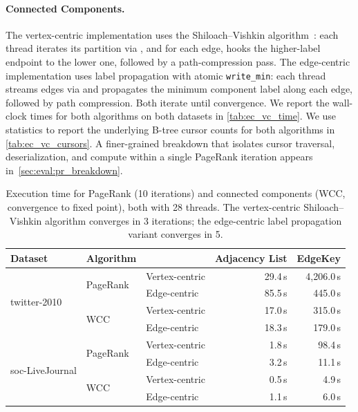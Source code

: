 \paragraph{Connected Components.}
The vertex-centric implementation uses the Shiloach--Vishkin algorithm~\cite{shiloach1982logn}: each thread iterates its partition via , and for each edge, hooks the higher-label endpoint to the lower one, followed by a path-compression pass.
The edge-centric implementation uses label propagation with atomic \texttt{write\_min}: each thread streams edges via  and propagates the minimum component label along each edge, followed by path compression.
Both iterate until convergence.
We report the wall-clock times for both algorithms on both datasets in \autoref{tab:ec_vc_time}.
We use \wt{} statistics to report the underlying \wt{} B-tree cursor counts for both algorithms in \autoref{tab:ec_vc_cursors}.
A finer-grained breakdown that isolates cursor traversal, deserialization, and compute within a single PageRank iteration appears in~\autoref{sec:eval:pr_breakdown}.

\begin{table}[ht]
\centering
\begin{tabular}{lllrr}
\toprule
\textbf{Dataset} & \textbf{Algorithm} & & \textbf{Adjacency List} & \textbf{EdgeKey} \\
\midrule
\multirow{4}{*}{twitter-2010}
  & \multirow{2}{*}{PageRank}
    & Vertex-centric &    29.4\,s & 4{,}206.0\,s \\
  & & Edge-centric   &    85.5\,s &   445.0\,s \\
  \cmidrule(l){2-5}
  & \multirow{2}{*}{\ac{WCC}}
    & Vertex-centric &    17.0\,s &   315.0\,s \\
  & & Edge-centric   &    18.3\,s &   179.0\,s \\
\midrule
\multirow{4}{*}{soc-LiveJournal}
  & \multirow{2}{*}{PageRank}
    & Vertex-centric &     1.8\,s &    98.4\,s \\
  & & Edge-centric   &     3.2\,s &    11.1\,s \\
  \cmidrule(l){2-5}
  & \multirow{2}{*}{\ac{WCC}}
    & Vertex-centric &     0.5\,s &     4.9\,s \\
  & & Edge-centric   &     1.1\,s &     6.0\,s \\
\bottomrule
\end{tabular}
\caption{Execution time for PageRank (10 iterations) and connected components (\ac{WCC}, convergence to fixed point), both with 28 threads. The vertex-centric Shiloach--Vishkin algorithm converges in 3 iterations; the edge-centric label propagation variant converges in 5.}
\label{tab:ec_vc_time}
\label{tab:cc_time}
\end{table}


